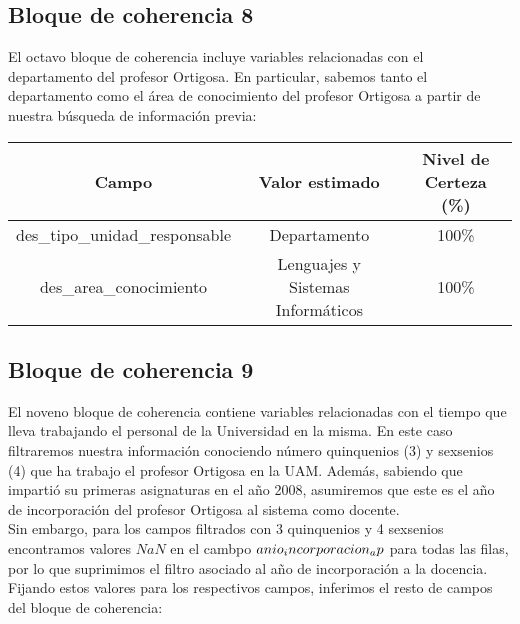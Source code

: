 \documentclass[a4paper]{article}
\begin{document}
\subsection{Bloque de coherencia 8}

El octavo bloque de coherencia incluye variables relacionadas con el departamento del profesor Ortigosa. En particular, sabemos tanto el departamento como el área de conocimiento del profesor Ortigosa a partir de nuestra búsqueda de información previa:

\begin{table}[H]
	\centering
	\begin{tabular}{ccc}
		\textbf{Campo}                     & \textbf{Valor estimado}           & \textbf{Nivel de Certeza (\%)} \\ \hline
		des\_tipo\_unidad\_responsable     & Departamento                      & 100\%                          \\
		des\_area\_conocimiento            & Lenguajes y Sistemas Informáticos & 100\%                          \\                    
	\end{tabular}
\end{table}

\subsection{Bloque de coherencia 9}

El noveno bloque de coherencia contiene variables relacionadas con el tiempo que lleva trabajando el personal de la Universidad en la misma. En este caso filtraremos nuestra información conociendo número quinquenios (3) y sexsenios (4) que ha trabajo el profesor Ortigosa en la UAM. Además, sabiendo que impartió su primeras asignaturas en el año 2008, asumiremos que este es el año de incorporación del profesor Ortigosa al sistema como docente. \\

Sin embargo, para los campos filtrados con 3 quinquenios y 4 sexsenios encontramos valores $NaN$ en el cambpo $anio\\_incorporacion\\_ap$ para todas las filas, por lo que suprimimos el filtro asociado al año de incorporación a la docencia. \\ 

Fijando estos valores para los respectivos campos, inferimos el resto de campos del bloque de coherencia:
\end{document}

